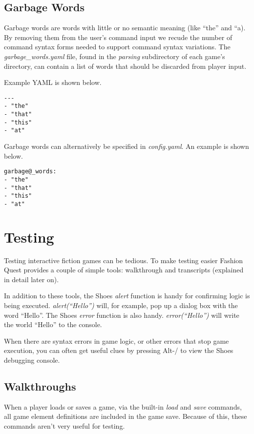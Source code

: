 \documentclass[letterpaper,10pt,english]{sphinxmanual}
\begin{document}
\subsection{Garbage Words}
\label{fine_tuning:garbage-words}
Garbage words are words with little or no semantic meaning (like ``the'' and ``a). By removing them from the user's command input we recude the number of command syntax forms needed to support command syntax variations. The \emph{garbage\_words.yaml} file, found in the \emph{parsing} subdirectory of each game's directory, can contain a list of words that should be discarded from player input.

Example YAML is shown below.

\begin{Verbatim}[commandchars=@\[\]]
---
- "the"
- "that"
- "this"
- "at"
\end{Verbatim}

Garbage words can alternatively be specified in \emph{config.yaml}. An example is shown below.

\begin{Verbatim}[commandchars=@\[\]]
garbage@_words:
- "the"
- "that"
- "this"
- "at"
\end{Verbatim}


\section{Testing}
\label{fine_tuning:testing}
Testing interactive fiction games can be tedious. To make testing easier Fashion Quest provides a couple of simple tools: walkthrough and transcripts (explained in detail later on).

In addition to these tools, the Shoes \emph{alert} function is handy for confirming logic is being executed. \emph{alert(``Hello'')} will, for example, pop up a dialog box with the word ``Hello''. The Shoes \emph{error} function is also handy. \emph{error(``Hello'')} will write the world ``Hello'' to the console.

When there are syntax errors in game logic, or other errors that stop game execution, you can often get useful clues by pressing Alt-/ to view the Shoes debugging console.


\subsection{Walkthroughs}
\label{fine_tuning:walkthroughs}
When a player loads or saves a game, via the built-in \emph{load} and \emph{save} commands, all game element definitions are included in the game save. Because of this, these commands aren't very useful for testing.
\end{document}
